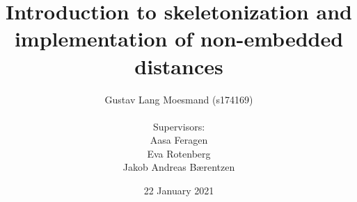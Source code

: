 \usepackage[utf8]{inputenc}
\usepackage{fancyhdr}
\usepackage{amsmath}
\usepackage{amsfonts}
\usepackage{amssymb}
\usepackage[left=2cm,right=2cm,top=2cm,bottom=2cm]{geometry}
\usepackage{mathtools}
\usepackage{qtree}
\usepackage{subfiles}
\usepackage{hyperref}
\usepackage{titlesec}
\usepackage{tocloft}

\usepackage{titlepic}
\usepackage{enumitem}
\usepackage{lastpage}
\usepackage{lipsum}
\usepackage{listings}
\usepackage{color}
\usepackage{caption}
\usepackage{subcaption}
\usepackage[font=small]{caption, subcaption}
\usepackage{float}



\pagestyle{fancy}
\fancyhf{}

\newcommand{\lr}[1]{\left\{ #1 \right\}}
\newcommand{\bs}[1]{\boldsymbol{ #1 }}

\title{Introduction to skeletonization and implementation of non-embedded distances}
\author{
    Gustav Lang Moesmand (s174169)\\\\
    Supervisors:\\
    Aasa Feragen\\
    Eva Rotenberg\\
    Jakob Andreas Bærentzen
}

\date{
    22 January 2021
}


\renewcommand{\cftsecnumwidth}{1em}

\renewcommand{\theequation}{\arabic{equation}}

